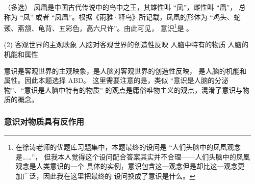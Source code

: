 \documentclass[10pt, UTF8]{book} %
\begin{document}
\begin{example}
    （多选）
    凤凰是中国古代传说中的鸟中之王，其雄性叫 “凤”，雌性叫 “凰”，
    总称为 “凤” 或者 “凤凰”。根据《雨雅·释鸟》所记载，凤凰的形体为
    “鸡头、蛇颈、燕颔、龟背、五彩色，高六尺许”。由此可见，
    意识\footnote{
        在徐涛老师的优题库习题集\cite{优题库}中，本题最终的设问是 “人们头脑中的凤凰观念是……”，
        但我本人觉得这个设问配合答案其实并不合理——人们头脑中的凤凰观念是人类意识的一个
        具体的实例，意识包含这一观念但是却比这一观念更加广泛，因此我在这里把最终的
        设问换成了意识是什么。
    }是 \underline{\qquad \qquad \qquad}。
    \begin{tasks}[label={\Alph*.}](2)
        \task 客观世界的主观映象
        \task 人脑对客观世界的创造性反映
        \task 人脑中特有的物质
        \task 人脑的机能和属性
    \end{tasks}
    \begin{cmt}
        意识是客观世界的主观映象，是人脑对客观世界的创造性反映，
        是人脑的机能和属性。因此本题选择 ABD。
        这里需要注意的是，类似 “意识是人脑的分泌物”、“意识是人脑中特有的物质”
        的观点是庸俗唯物主义的观点，混淆了意识与物质的概念。
    \end{cmt}
\end{example}

\subsubsection{意识对物质具有反作用}
\end{document}
